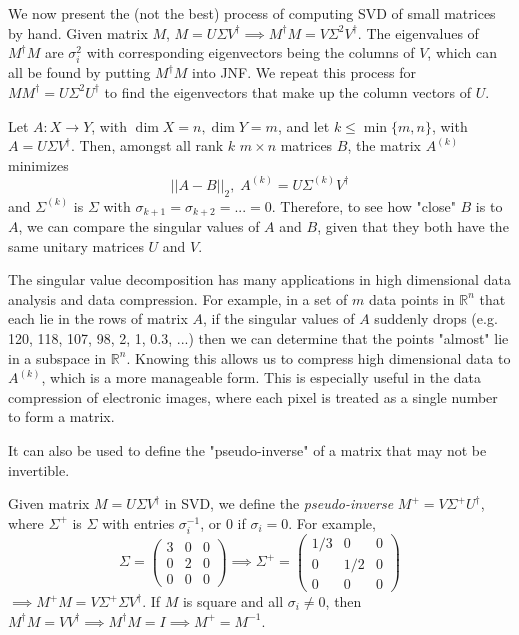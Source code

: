 \documentclass{article}
\begin{document}
    We now present the (not the best) process of computing SVD of small matrices by hand. Given matrix $M$, $M = U \Sigma V^\dagger \implies M^\dagger M = V \Sigma^2 V^\dagger$. The eigenvalues of $M^\dagger M$ are $\sigma_i^2$ with corresponding eigenvectors being the columns of $V$, which can all be found by putting $M^\dagger M$ into JNF. We repeat this process for $M M^\dagger = U \Sigma^2 U^\dagger$ to find the eigenvectors that make up the column vectors of $U$. 

    \begin{theorem}
    Let $A: X \longrightarrow Y$, with $\dim{X} = n, \dim{Y} = m$, and let $k \leq \min{\{m, n\}}$, with $A = U \Sigma V^\dagger$. Then, amongst all rank $k$ $m \times n$ matrices $B$, the matrix $A^{(k)}$ minimizes 
    \[||A-B||_2, \; A^{(k)} = U \Sigma^{(k)} V^\dagger\]
    and $\Sigma^{(k)}$ is $\Sigma$ with $\sigma_{k+1} = \sigma_{k+2} = ... = 0$. Therefore, to see how "close" $B$ is to $A$, we can compare the singular values of $A$ and $B$, given that they both have the same unitary matrices $U$ and $V$. 
    \end{theorem}

    The singular value decomposition has many applications in high dimensional data analysis and data compression. For example, in a set of $m$ data points in $\mathbb{R}^n$ that each lie in the rows of matrix $A$, if the singular values of $A$ suddenly drops (e.g. 120, 118, 107, 98, 2, 1, 0.3, ...) then we can determine that the points "almost" lie in a subspace in $\mathbb{R}^n$. Knowing this allows us to compress high dimensional data to $A^{(k)}$, which is a more manageable form. This is especially useful in the data compression of electronic images, where each pixel is treated as a single number to form a matrix. 

    It can also be used to define the "pseudo-inverse" of a matrix that may not be invertible. 

    \begin{definition}
    Given matrix $M = U \Sigma V^\dagger$ in SVD, we define the \textit{pseudo-inverse} $M^+ = V \Sigma^+ U^\dagger$, where $\Sigma^+$ is $\Sigma$ with entries $\sigma_i^{-1}$, or $0$ if $\sigma_i = 0$. For example,
    \[ \Sigma = \begin{pmatrix}3&0&0\\0&2&0\\0&0&0\end{pmatrix} \implies \Sigma^+ = \begin{pmatrix}1/3&0&0\\0&1/2&0\\0&0&0\end{pmatrix}\]
    $\implies M^+ M = V \Sigma^+ \Sigma V^\dagger$. If $M$ is square and all $\sigma_i \neq 0$, then $M^\dagger M = V V^\dagger \implies M^\dagger M = I \implies  M^+ = M^{-1}$. 
    \end{definition}
\end{document}

